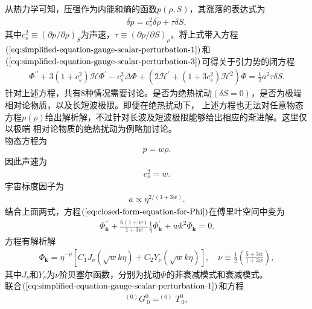 从热力学可知，压强作为内能和熵的函数$p(\rho, S)$，其涨落的表达式为
\begin{align}
  \label{eq:perturbation-of-pressure}
  \overline{\delta
  p}=c^2_{s}\overline{\delta\rho}+\tau\delta S,
\end{align}
其中$c^2_{s}\equiv {\left(\partial p /\partial
\rho\right)}_{S}$为声速，$\tau\equiv{\left(\partial p /\partial
S\right)}_{\rho}$。将上式带入方程$(\ref{eq:simplified-equation-gauge-scalar-perturbation-1})$和$(\ref{eq:simplified-equation-gauge-scalar-perturbation-3})$可得关于引力势的闭方程
\begin{align}
  \label{eq:closed-form-equation-for-Phi}
  \Phi^{\prime\prime}+3{\left(1+c^2_{s}\right)}\mathcal{H}\Phi^\prime-c^2_{s}\Delta\Phi+{\left(2\mathcal{H}^{\prime}+
  {\left(1+3c^2_{s}\right)}\mathcal{H}^2\right)}\Phi=\frac{1}{2}a^2\tau\delta S.
\end{align}
针对上述方程，共有8种情况需要讨论。是否为绝热扰动${\left(\delta
S=0\right)}$，是否为极端相对论物质，以及长短波极限。即便在绝热扰动下，
上述方程也无法对任意物态方程$p(\rho)$给出解析解，不过针对长波及短波极限能够给出相应的渐进解。这里仅以极端
相对论物质的绝热扰动为例略加讨论。
\\
物态方程为
\begin{align}
  p=w\rho.
\end{align}
因此声速为
\begin{align}
  c^2_{s}=w.
\end{align}
宇宙标度因子为
\begin{align}
  a\propto\eta^{2 /(1+3w)}.
\end{align}
结合上面两式，方程$(\ref{eq:closed-form-equation-for-Phi})$在傅里叶空间中变为
\begin{align}
  \label{eq:adiabatic-relativistic-equation-of-Phi}
  \Phi^{\prime\prime}_{\mathbf{k}}+\frac{6(1+w)}{1+3w}\frac{1}{\eta}\Phi^\prime_{\mathbf{k}}+wk^2\Phi_{\mathbf{k}}=0.
\end{align}
方程有解析解
\begin{align}
  \label{eq:solution-for-adiabatic-relativistic-equation-of-Phi}
  \Phi_{\mathbf{k}}=\eta^{-\nu}{\left[
  C_1J_{\nu}{\left(\sqrt{w}k\eta\right)}+C_2Y_{\nu}{\left(\sqrt{w}k\eta\right)}
  \right]},\quad
  \nu\equiv \frac{1}{2}{\left(\frac{5+3w}{1+3w}\right)},
\end{align}
其中$J_{\nu}$和$Y_{\nu}$为$\nu$阶贝塞尔函数，分别为扰动$\Phi$的非衰减模式和衰减模式。\\
联合$(\ref{eq:simplified-equation-gauge-scalar-perturbation-1})$和方程
\begin{align}
  ^{(0)}G^{0}_{~0} =^{(0)}T^{0}_{~0}, 
\end{align}
